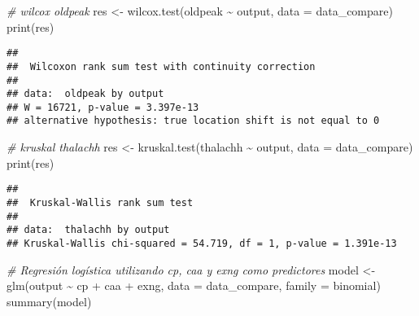 \documentclass[
]{article}
\newenvironment{Shaded}{\begin{snugshade}}{\end{snugshade}}
\newcommand{\AttributeTok}[1]{\textcolor[rgb]{0.77,0.63,0.00}{#1}}
\newcommand{\CommentTok}[1]{\textcolor[rgb]{0.56,0.35,0.01}{\textit{#1}}}
\newcommand{\FunctionTok}[1]{\textcolor[rgb]{0.00,0.00,0.00}{#1}}
\newcommand{\NormalTok}[1]{#1}
\newcommand{\OtherTok}[1]{\textcolor[rgb]{0.56,0.35,0.01}{#1}}
\newcommand{\SpecialCharTok}[1]{\textcolor[rgb]{0.00,0.00,0.00}{#1}}
\begin{document}
\begin{Shaded}
\begin{Highlighting}[]
\CommentTok{\# wilcox oldpeak}
\NormalTok{res }\OtherTok{\textless{}{-}} \FunctionTok{wilcox.test}\NormalTok{(oldpeak }\SpecialCharTok{\textasciitilde{}}\NormalTok{ output, }\AttributeTok{data =}\NormalTok{ data\_compare)}
\FunctionTok{print}\NormalTok{(res)}
\end{Highlighting}
\end{Shaded}

\begin{verbatim}
## 
##  Wilcoxon rank sum test with continuity correction
## 
## data:  oldpeak by output
## W = 16721, p-value = 3.397e-13
## alternative hypothesis: true location shift is not equal to 0
\end{verbatim}

\begin{Shaded}
\begin{Highlighting}[]
\CommentTok{\# kruskal thalachh}
\NormalTok{res }\OtherTok{\textless{}{-}} \FunctionTok{kruskal.test}\NormalTok{(thalachh }\SpecialCharTok{\textasciitilde{}}\NormalTok{ output, }\AttributeTok{data =}\NormalTok{ data\_compare)}
\FunctionTok{print}\NormalTok{(res)}
\end{Highlighting}
\end{Shaded}

\begin{verbatim}
## 
##  Kruskal-Wallis rank sum test
## 
## data:  thalachh by output
## Kruskal-Wallis chi-squared = 54.719, df = 1, p-value = 1.391e-13
\end{verbatim}

\begin{Shaded}
\begin{Highlighting}[]
\CommentTok{\# Regresión logística utilizando \textquotesingle{}cp\textquotesingle{}, \textquotesingle{}caa\textquotesingle{} y \textquotesingle{}exng\textquotesingle{} como predictores}
\NormalTok{model }\OtherTok{\textless{}{-}} \FunctionTok{glm}\NormalTok{(output }\SpecialCharTok{\textasciitilde{}}\NormalTok{ cp }\SpecialCharTok{+}\NormalTok{ caa }\SpecialCharTok{+}\NormalTok{ exng, }\AttributeTok{data =}\NormalTok{ data\_compare, }\AttributeTok{family =}\NormalTok{ binomial)}
\FunctionTok{summary}\NormalTok{(model)}
\end{Highlighting}
\end{Shaded}
\end{document}
